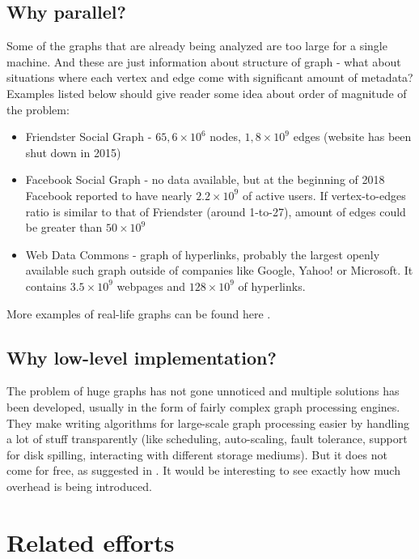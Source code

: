 \subsection{Why parallel?}
Some of the graphs that are already being analyzed are too large for a single machine. And these are just information about structure of graph - what about situations where each vertex and edge come with significant amount of metadata? Examples listed below should give reader some idea about order of magnitude of the problem:
\begin{itemize}
    \item Friendster Social Graph - $65,6 \times 10^6$ nodes, $1,8 \times 10^9$ edges (website has been shut down in 2015)
    \item Facebook Social Graph - no data available, but at the beginning of 2018 Facebook reported to have nearly $ 2.2 \times 10^9 $ of active users. If vertex-to-edges ratio is similar to that of Friendster (around 1-to-27), amount of edges could be greater than $50 \times 10^9$ \cite{facebook-user-count}
    \item Web Data Commons - graph of hyperlinks, probably the largest openly available such graph outside of companies like Google, Yahoo! or Microsoft. It contains $3.5 \times 10^9$ webpages and $ 128 \times 10^9 $ of hyperlinks. \cite{wdc-graph}
\end{itemize}
More examples of real-life graphs can be found here \cite{gap-graphs}.

\subsection{Why low-level implementation?}
The problem of huge graphs has not gone unnoticed and multiple solutions has been developed, usually in the form of fairly complex graph processing engines. They make writing algorithms for large-scale graph processing easier by handling a lot of stuff transparently (like scheduling, auto-scaling, fault tolerance, support for disk spilling, interacting with different storage mediums). But it does not come for free, as suggested in \cite{mcsherry-scalable-overhead}. It would be interesting to see exactly how much overhead is being introduced.



\section{Related efforts}

